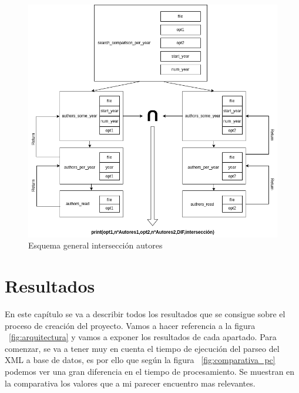 \documentclass[a4paper, 12pt]{book}
\begin{document}
\begin{figure}[h]
  \centering
  \includegraphics[width=16cm, keepaspectratio]{img/s_c_p_y.png}
  \caption{Esquema general intersección autores}
  \label{fig:s_c_p_y}
\end{figure}

\cleardoublepage
\chapter{Resultados}
\label{chap:resultados}

En este capítulo se va a describir todos los resultados que se consigue sobre el proceso de creación del proyecto. Vamos a hacer referencia a la figura ~\ref{fig:arquitectura} y vamos a exponer los resultados de cada apartado.
Para comenzar, se va a tener muy en cuenta el tiempo de ejecución del parseo del XML a base de datos, es por ello que según la figura ~\ref{fig:comparativa_pc} podemos ver una gran diferencia en el tiempo de procesamiento. Se muestran en la comparativa los valores que a mi parecer encuentro mas relevantes.
\end{document}

